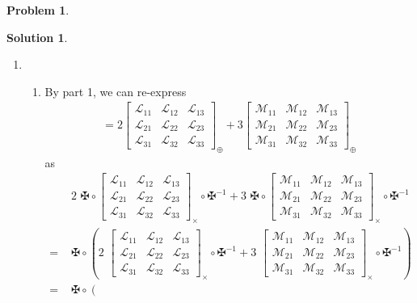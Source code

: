 \documentclass{article}
\theoremstyle{definition}
\newtheorem*{prob*}{Problem}
\newtheorem*{sln*}{Solution}
\newcommand{\lag}{\mathcal{L}}
\newcommand{\M}{\mathcal{M}}
\begin{document}
\begin{prob*}
\begin{sln*}
\begin{enumerate}
			\item 
			\begin{enumerate}
				\item By part 1, we can re-express
				\begin{align*}
				[(2\lag_\oplus + 3\M_\oplus)_{ij}] = 2\begin{bmatrix}
				\lag_{11} & \lag_{12} & \lag_{13}\\
				\lag_{21} & \lag_{22} & \lag_{23}\\
				\lag_{31} & \lag_{32} & \lag_{33}
				\end{bmatrix}_\oplus
				+ 
				3\begin{bmatrix}
				\M_{11} & \M_{12} & \M_{13}\\
				\M_{21} & \M_{22} & \M_{23}\\
				\M_{31} & \M_{32} & \M_{33}
				\end{bmatrix}_\oplus 
				\end{align*}
				as 
				\begin{align*}
				&2\,\,\maltese \circ \begin{bmatrix}
				\lag_{11} & \lag_{12} & \lag_{13}\\
				\lag_{21} & \lag_{22} & \lag_{23}\\
				\lag_{31} & \lag_{32} & \lag_{33}
				\end{bmatrix}_\times \circ \maltese^{-1}
				+ 
				3\,\,\maltese\circ\begin{bmatrix}
				\M_{11} & \M_{12} & \M_{13}\\
				\M_{21} & \M_{22} & \M_{23}\\
				\M_{31} & \M_{32} & \M_{33}
				\end{bmatrix}_\times \circ \maltese^{-1} \\
				=\,\,
				&\maltese \circ \left(
				2\,\, \begin{bmatrix}
				\lag_{11} & \lag_{12} & \lag_{13}\\
				\lag_{21} & \lag_{22} & \lag_{23}\\
				\lag_{31} & \lag_{32} & \lag_{33}
				\end{bmatrix}_\times \circ \maltese^{-1}
				+
				3\,\, \begin{bmatrix}
				\M_{11} & \M_{12} & \M_{13}\\
				\M_{21} & \M_{22} & \M_{23}\\
				\M_{31} & \M_{32} & \M_{33}
				\end{bmatrix}_\times \circ \maltese^{-1}
				\right)\\
				=\,\,
				&\maltese \circ \left(

\end{align*}
\end{enumerate}
\end{enumerate}
\end{sln*}
\end{prob*}
\end{document}
